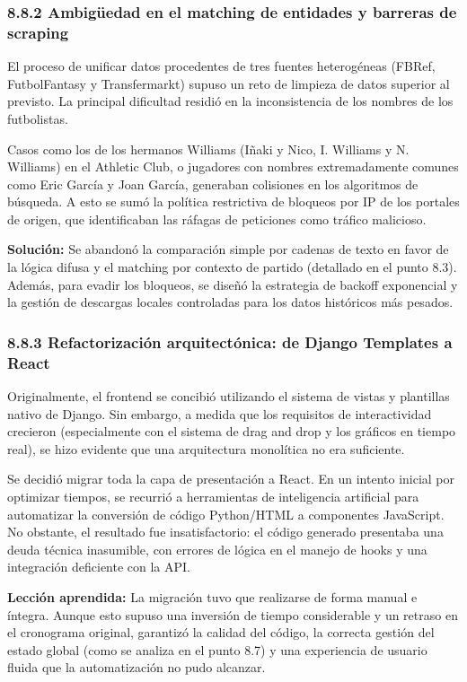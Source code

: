 \subsubsection{8.8.2 Ambigüedad en el matching de entidades y barreras de scraping}
El proceso de unificar datos procedentes de tres fuentes heterogéneas (FBRef, FutbolFantasy y Transfermarkt) supuso un reto de limpieza de datos superior al previsto. La principal 
dificultad residió en la inconsistencia de los nombres de los futbolistas.

Casos como los de los hermanos Williams (Iñaki y Nico, I. Williams y N. Williams) en el Athletic Club, o jugadores con nombres extremadamente comunes como Eric García y Joan García, generaban colisiones en los algoritmos de búsqueda. 
A esto se sumó la política restrictiva de bloqueos por IP de los portales de origen, que identificaban las ráfagas de peticiones como tráfico malicioso.

\textbf{Solución:} Se abandonó la comparación simple por cadenas de texto en favor de la lógica difusa y el matching por contexto de partido (detallado en el punto 8.3). Además, para evadir los bloqueos, se diseñó 
la estrategia de backoff exponencial y la gestión de descargas locales controladas para los datos históricos más pesados.

\subsubsection{8.8.3 Refactorización arquitectónica: de Django Templates a React}
Originalmente, el frontend se concibió utilizando el sistema de vistas y plantillas nativo de Django. Sin embargo, a medida que los requisitos de interactividad crecieron (especialmente con el sistema de drag and drop
 y los gráficos en tiempo real), se hizo evidente que una arquitectura monolítica no era suficiente.

Se decidió migrar toda la capa de presentación a React. En un intento inicial por optimizar tiempos, se recurrió a herramientas de inteligencia artificial para automatizar la conversión de código Python/HTML a
 componentes JavaScript. No obstante, el resultado fue insatisfactorio: el código generado presentaba una deuda técnica inasumible, con errores de lógica en el manejo de hooks y una integración deficiente con la API.

\textbf{Lección aprendida:} La migración tuvo que realizarse de forma manual e íntegra. Aunque esto supuso una inversión de tiempo considerable y un retraso en el cronograma original, garantizó la calidad del código, 
la correcta gestión del estado global (como se analiza en el punto 8.7) y una experiencia de usuario fluida que la automatización no pudo alcanzar.

